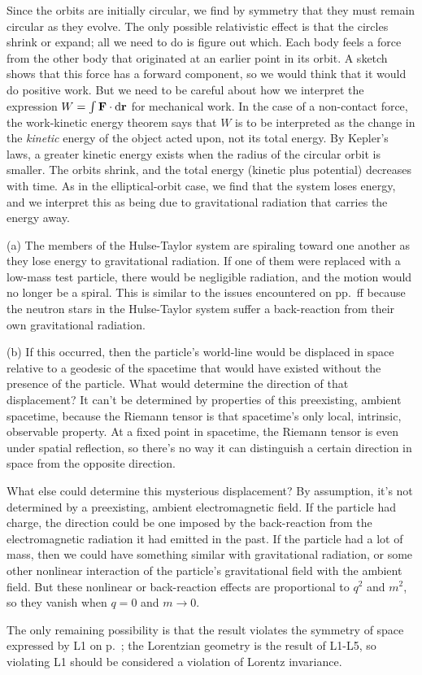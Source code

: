 
Since the orbits are initially circular, we find by symmetry that they must remain circular as
they evolve. The only possible relativistic effect is that the circles shrink or expand; all
we need to do is figure out which.
Each body feels a force from the other body that originated at an earlier point in its orbit.
A sketch shows that this force has a forward component, so we would think that it would do
positive work. But we need to be careful about how we interpret the expression $W=\int\mathbf{F}\cdot\textup{d}\mathbf{r}$
for mechanical work. In the case of a non-contact force, the work-kinetic energy theorem says that
$W$ is to be interpreted as the change in the \emph{kinetic} energy of the object acted upon, not its
total energy. By Kepler's laws, a greater kinetic energy exists when the radius of the circular orbit
is smaller. The orbits shrink, and the total energy (kinetic plus potential) decreases with time.
As in the elliptical-orbit case, we find that the system loses energy, and we interpret this as being
due to gravitational radiation that carries the energy away.

(a) The members of the Hulse-Taylor system are spiraling toward one another as they lose energy to
gravitational radiation. If one of them were replaced with a low-mass test particle, there
would be negligible radiation, and the motion would no longer be a spiral. This is similar
to the issues encountered on pp.~\pageref{sec:chiao-paradox}ff because the neutron stars in
the Hulse-Taylor system suffer a back-reaction from their own gravitational radiation.

(b) If this occurred, then the particle's world-line would be displaced in space relative
to a geodesic of the spacetime that would have existed without the presence of the particle.
What would determine the direction of that displacement?
It can't be determined by properties of this preexisting, ambient spacetime, because
the Riemann tensor is that spacetime's only local, intrinsic, observable property.
At a fixed point in spacetime, the Riemann tensor is even under spatial reflection, so there's no way it can distinguish
a certain direction in space from the opposite direction.

What else could determine this mysterious displacement?
By assumption, it's not determined by a preexisting, ambient electromagnetic field.
If the particle had charge, the direction could be one imposed by the back-reaction from the electromagnetic
radiation it had emitted in the past. If the particle had a lot of mass, then we could have
something similar with gravitational radiation, or some other nonlinear interaction of the
particle's gravitational field with the ambient field. But these nonlinear or back-reaction
effects are proportional to $q^2$ and $m^2$, so they vanish when $q=0$ and $m\rightarrow 0$.

The only remaining possibility is that the result violates the symmetry of space expressed by L1 on p.~\pageref{sec:lorentz-geometry};
the Lorentzian geometry is the result of L1-L5, so violating L1 should be considered a violation of Lorentz
invariance.
